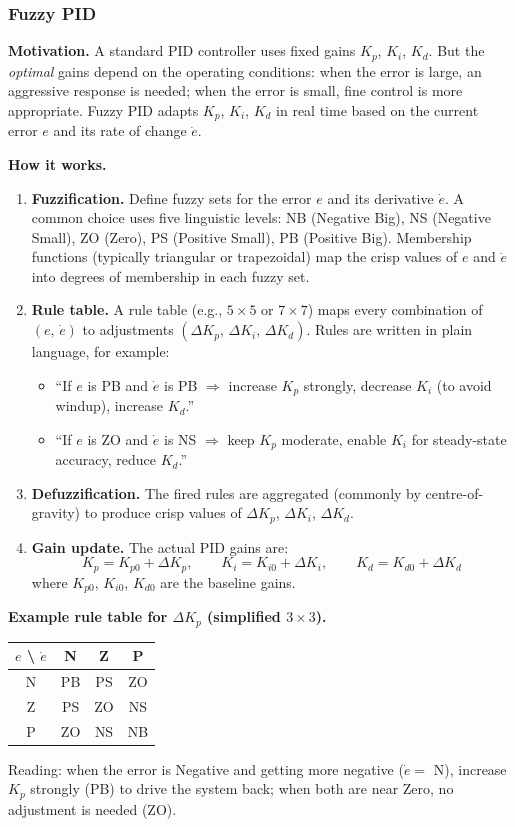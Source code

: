 \subsubsection{Fuzzy PID}

\textbf{Motivation.} A standard PID controller uses fixed gains $K_p$, $K_i$, $K_d$. But the \emph{optimal} gains depend on the operating conditions: when the error is large, an aggressive response is needed; when the error is small, fine control is more appropriate. Fuzzy PID adapts $K_p$, $K_i$, $K_d$ in real time based on the current error $e$ and its rate of change $\dot{e}$.

\textbf{How it works.}
\begin{enumerate}
    \item \textbf{Fuzzification.} Define fuzzy sets for the error $e$ and its derivative $\dot{e}$. A common choice uses five linguistic levels: NB (Negative Big), NS (Negative Small), ZO (Zero), PS (Positive Small), PB (Positive Big). Membership functions (typically triangular or trapezoidal) map the crisp values of $e$ and $\dot{e}$ into degrees of membership in each fuzzy set.
    \item \textbf{Rule table.} A rule table (e.g., $5 \times 5$ or $7 \times 7$) maps every combination of $(e,\, \dot{e})$ to adjustments $(\Delta K_p,\, \Delta K_i,\, \Delta K_d)$. Rules are written in plain language, for example:
    \begin{itemize}
        \item ``If $e$ is PB and $\dot{e}$ is PB $\Rightarrow$ increase $K_p$ strongly, decrease $K_i$ (to avoid windup), increase $K_d$.''
        \item ``If $e$ is ZO and $\dot{e}$ is NS $\Rightarrow$ keep $K_p$ moderate, enable $K_i$ for steady-state accuracy, reduce $K_d$.''
    \end{itemize}
    \item \textbf{Defuzzification.} The fired rules are aggregated (commonly by centre-of-gravity) to produce crisp values of $\Delta K_p$, $\Delta K_i$, $\Delta K_d$.
    \item \textbf{Gain update.} The actual PID gains are:
    \[
        K_p = K_{p0} + \Delta K_p, \qquad K_i = K_{i0} + \Delta K_i, \qquad K_d = K_{d0} + \Delta K_d
    \]
    where $K_{p0}$, $K_{i0}$, $K_{d0}$ are the baseline gains.
\end{enumerate}

\textbf{Example rule table for $\Delta K_p$ (simplified $3 \times 3$).}
\begin{center}
\begin{tabular}{c|ccc}
    $e$ \textbackslash{} $\dot{e}$ & N & Z & P \\
    \hline
    N & PB & PS & ZO \\
    Z & PS & ZO & NS \\
    P & ZO & NS & NB \\
\end{tabular}
\end{center}
Reading: when the error is Negative and getting more negative ($\dot{e} = $ N), increase $K_p$ strongly (PB) to drive the system back; when both are near Zero, no adjustment is needed (ZO).


